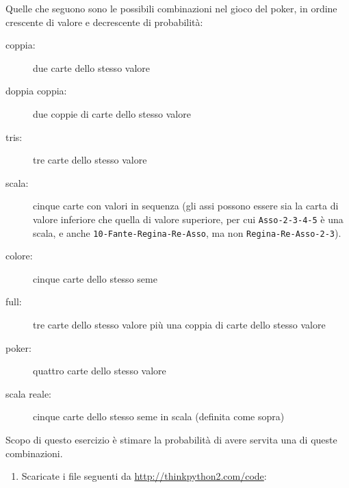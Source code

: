 \documentclass[10pt]{book}
\begin{document}
\vspace{0.2in}
\begin{exercise}
\label{poker}

Quelle che seguono sono le possibili combinazioni nel gioco del poker, in ordine crescente di valore e decrescente di probabilità:

\begin{description}

\item[coppia:] due carte dello stesso valore
\vspace{-0.05in}

\item[doppia coppia:] due coppie di carte dello stesso valore
\vspace{-0.05in}

\item[tris:] tre carte dello stesso valore
\vspace{-0.05in}

\item[scala:] cinque carte con valori in sequenza (gli assi possono essere sia la carta di valore inferiore che quella di valore superiore, per cui {\tt Asso-2-3-4-5} è una scala, e anche {\tt 10-Fante-Regina-Re-Asso}, ma non {\tt Regina-Re-Asso-2-3}).
\vspace{-0.05in}

\item[colore:] cinque carte dello stesso seme
\vspace{-0.05in}

\item[full:] tre carte dello stesso valore più una coppia di carte dello stesso valore
\vspace{-0.05in}

\item[poker:] quattro carte dello stesso valore
\vspace{-0.05in}

\item[scala reale:] cinque carte dello stesso seme in scala (definita come sopra)
\vspace{-0.05in}

\end{description}
%
Scopo di questo esercizio è stimare la probabilità di avere servita una di queste combinazioni.

\begin{enumerate}

\item Scaricate i file seguenti da \url{http://thinkpython2.com/code}:


\end{enumerate}
\end{exercise}
\end{document}
